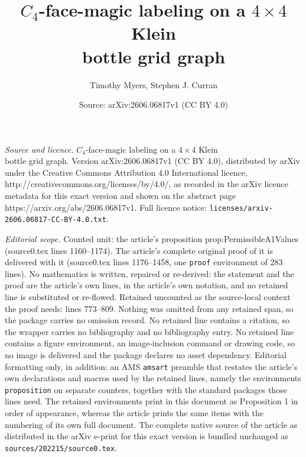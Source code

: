 \documentclass[10pt,a4paper]{amsart}
\title{$C_4$-face-magic labeling on a $4 \times 4$ Klein \\ bottle grid graph}
\author{Timothy Myers, Stephen J. Curran}
\date{Source: arXiv:2606.06817v1 (CC BY 4.0)}
\begin{document}
\maketitle

\noindent\emph{Source and licence.} $C_4$-face-magic labeling on a $4 \times 4$ Klein \\ bottle grid graph. Version arXiv:2606.06817v1 (CC BY 4.0), distributed by arXiv under the Creative Commons Attribution 4.0 International licence, http://creativecommons.org/licenses/by/4.0/, as recorded in the arXiv licence metadata for this exact version and shown on the abstract page https://arxiv.org/abs/2606.06817v1. Full licence notice: \texttt{licenses/arxiv-2606.06817-CC-BY-4.0.txt}.\par\smallskip

\noindent\textit{Editorial scope.} Counted unit: the article's proposition prop:PermissibleA1Values (source0.tex lines 1160--1174). The article's complete original proof of it is delivered with it (source0.tex lines 1176--1458, one \texttt{proof} environment of 283 lines). No mathematics is written, repaired or re-derived: the statement and the proof are the article's own lines, in the article's own notation, and no retained line is substituted or re-flowed.  Retained uncounted as the source-local context the proof needs: lines 773--809.  Nothing was omitted from any retained span, so the package carries no omission record.  No retained line contains a citation, so the wrapper carries no bibliography and no bibliography entry.  No retained line contains a figure environment, an image-inclusion command or drawing code, so no image is delivered and the package declares no asset dependency.  Editorial formatting only, in addition: an AMS \texttt{amsart} preamble that restates the article's own declarations and macros used by the retained lines, namely the environments \texttt{proposition} on separate counters, together with the standard packages those lines need.  The retained environments print in this document as Proposition 1 in order of appearance, whereas the article prints the same items with the numbering of its own full document.  The complete native source of the article as distributed in the arXiv e-print for this exact version is bundled unchanged as \texttt{sources/202215/source0.tex}.
\end{document}

